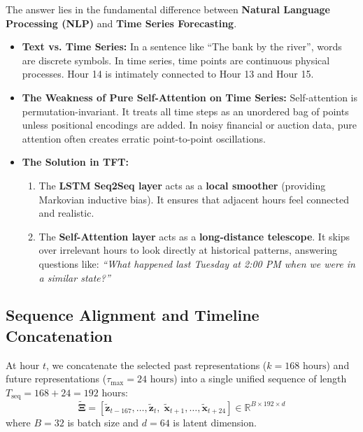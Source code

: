 \documentclass[11pt,a4paper]{article}
\begin{document}
The answer lies in the fundamental difference between \textbf{Natural Language Processing (NLP)} and \textbf{Time Series Forecasting}.

\begin{intuitionbox}
\begin{itemize}
    \item \textbf{Text vs. Time Series:} In a sentence like ``The bank by the river'', words are discrete symbols. In time series, time points are continuous physical processes. Hour 14 is intimately connected to Hour 13 and Hour 15.
    \item \textbf{The Weakness of Pure Self-Attention on Time Series:} Self-attention is permutation-invariant. It treats all time steps as an unordered bag of points unless positional encodings are added. In noisy financial or auction data, pure attention often creates erratic point-to-point oscillations.
    \item \textbf{The Solution in TFT:}
    \begin{enumerate}
        \item The \textbf{LSTM Seq2Seq layer} acts as a \textbf{local smoother} (providing Markovian inductive bias). It ensures that adjacent hours feel connected and realistic.
        \item The \textbf{Self-Attention layer} acts as a \textbf{long-distance telescope}. It skips over irrelevant hours to look directly at historical patterns, answering questions like: \textit{``What happened last Tuesday at 2:00 PM when we were in a similar state?''}
    \end{enumerate}
\end{itemize}
\end{intuitionbox}

\subsection{Sequence Alignment and Timeline Concatenation}
At hour $t$, we concatenate the selected past representations ($k = 168\text{ hours}$) and future representations ($\tau_{\max} = 24\text{ hours}$) into a single unified sequence of length $T_{\text{seq}} = 168 + 24 = 192\text{ hours}$:
\begin{equation}
    \tilde{\boldsymbol{\Xi}} = \left[ \tilde{\mathbf{z}}_{t-167}, \dots, \tilde{\mathbf{z}}_t, \; \tilde{\mathbf{x}}_{t+1}, \dots, \tilde{\mathbf{x}}_{t+24} \right] \in \mathbb{R}^{B \times 192 \times d}
\end{equation}
where $B=32$ is batch size and $d=64$ is latent dimension.
\end{document}
